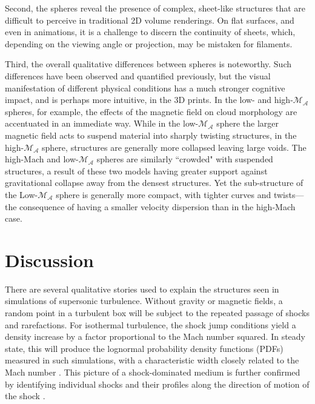\documentclass[twocolumn]{aastex63}
\begin{document}
Second, the spheres reveal the presence of complex, sheet-like structures that are difficult to perceive in traditional 2D volume renderings.  On flat surfaces, and even in animations, it is a challenge to discern the continuity of sheets, which, depending on the viewing angle or projection, may be mistaken for filaments.

Third, the overall qualitative differences between spheres is noteworthy.  Such differences have been observed and quantified previously, but the visual manifestation of different physical conditions has a much stronger cognitive impact, and is perhaps more intuitive, in the 3D prints. In the low- and high-$\mathcal{M_A}$ spheres, for example, the effects of the magnetic field on cloud morphology are accentuated in an immediate way. While in the low-$\mathcal{M_A}$ sphere the larger magnetic field acts to suspend material into sharply twisting structures, in the high-$\mathcal{M_A}$ sphere, structures are generally more collapsed leaving large voids. The high-Mach and low-$\mathcal{M_A}$ spheres are similarly ``crowded" with suspended structures, a result of these two models having greater support against gravitational collapse away from the densest structures. Yet the sub-structure of the Low-$\mathcal{M_A}$ sphere is generally more compact, with tighter curves and twists---the consequence of having a smaller velocity dispersion than in the high-Mach case.



\section{Discussion}\label{sec:discussion}
There are several qualitative stories used to explain the structures seen in simulations of supersonic turbulence. Without gravity or magnetic fields, a random point in a turbulent box will be subject to the repeated passage of shocks and rarefactions. For isothermal turbulence, the shock jump conditions yield a density increase by a factor proportional to the Mach number squared. In steady state, this will produce the lognormal probability density functions (PDFs) measured in such simulations, with a characteristic width closely related to the Mach number \citep[e.g.,][]{Padoan_1997, Padoan_2002, Federrath_2008}. This picture of a shock-dominated medium is further confirmed  by identifying individual shocks and their profiles along the direction of motion of the shock \citep{Robertson_2018}.
\end{document}
